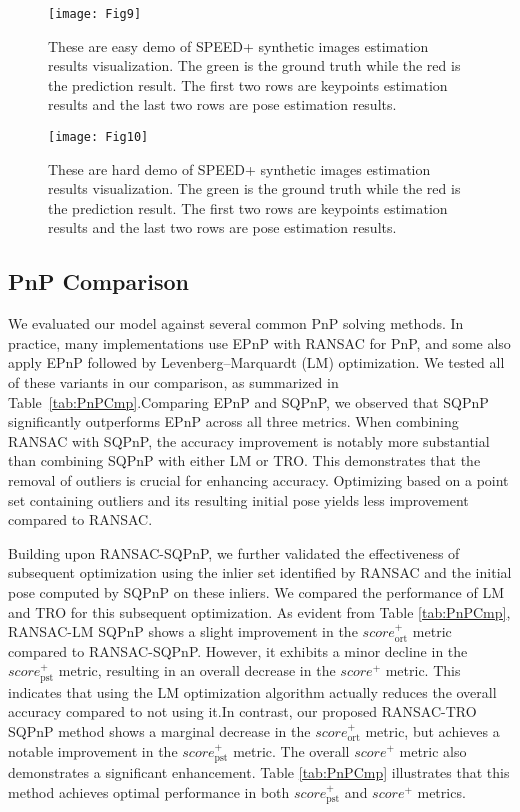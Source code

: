 \documentclass[a4paper,fleqn]{cas-sc}
\begin{document}
\begin{figure*}[!t]
	\centering
	\texttt{[image: Fig9]} 
	\caption{These are easy demo of SPEED+ synthetic images estimation results visualization. The green is the ground truth while the red is the prediction result. The first two rows are keypoints estimation results and the last two rows are pose estimation results.}
	\label{fig:easydemo}
\end{figure*}

\begin{figure*}[!t]
	\centering
	\texttt{[image: Fig10]} 
	\caption{These are hard demo of SPEED+ synthetic images estimation results visualization. The green is the ground truth while the red is the prediction result. The first two rows are keypoints estimation results and the last two rows are pose estimation results.}
	\label{fig:harddemo}
\end{figure*}

\subsection{PnP Comparison}
We evaluated our model against several common PnP solving methods. In practice, many implementations use EPnP with RANSAC for PnP, and some also apply EPnP followed by Levenberg–Marquardt (LM) optimization. We tested all of these variants in our comparison, as summarized in Table~\ref{tab:PnPCmp}.Comparing EPnP and SQPnP, we observed that SQPnP significantly outperforms EPnP across all three metrics. When combining RANSAC with SQPnP, the accuracy improvement is notably more substantial than combining SQPnP with either LM or TRO. This demonstrates that the removal of outliers is crucial for enhancing accuracy. Optimizing based on a point set containing outliers and its resulting initial pose yields less improvement compared to RANSAC.

Building upon RANSAC-SQPnP, we further validated the effectiveness of subsequent optimization using the inlier set identified by RANSAC and the initial pose computed by SQPnP on these inliers. We compared the performance of LM and TRO for this subsequent optimization. As evident from Table \ref{tab:PnPCmp}, RANSAC-LM SQPnP shows a slight improvement in the $score_{\text{ort}}^+$ metric compared to RANSAC-SQPnP. However, it exhibits a minor decline in the $score_{\text{pst}}^+$ metric, resulting in an overall decrease in the $score^+$ metric. This indicates that using the LM optimization algorithm actually reduces the overall accuracy compared to not using it.In contrast, our proposed RANSAC-TRO SQPnP method shows a marginal decrease in the $score_{\text{ort}}^+$ metric, but achieves a notable improvement in the $score_{\text{pst}}^+$ metric. The overall $score^+$ metric also demonstrates a significant enhancement. Table \ref{tab:PnPCmp} illustrates that this method achieves optimal performance in both $score_{\text{pst}}^+$ and $score^+$ metrics.
\end{document}

